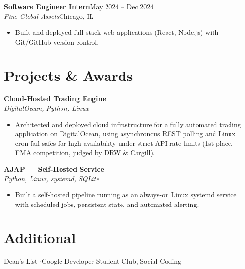 \documentclass[letterpaper,10.5pt]{article}
\newcommand{\entry}[4]{\textbf{#1}\hfill{\small #2}\\\textit{\small #3}\hfill{\small #4}\par\vspace{1pt}}
\begin{document}
\entry{Software Engineer Intern}{May 2024 -- Dec 2024}{Fine Global Assets}{Chicago, IL}
\begin{itemize}
  \item Built and deployed full-stack web applications (React, Node.js) with Git/GitHub version control.
\end{itemize}

\section{Projects \& Awards}
\entry{Cloud-Hosted Trading Engine}{}{DigitalOcean, Python, Linux}{}
\begin{itemize}
  \item Architected and deployed cloud infrastructure for a fully automated trading application on DigitalOcean, using asynchronous REST polling and Linux cron fail-safes for high availability under strict API rate limits (1st place, FMA competition, judged by DRW \& Cargill).
\end{itemize}

\entry{AJAP --- Self-Hosted Service}{}{Python, Linux, systemd, SQLite}{}
\begin{itemize}
  \item Built a self-hosted pipeline running as an always-on Linux systemd service with scheduled jobs, persistent state, and automated alerting.
\end{itemize}

\section{Additional}
{\small Dean's List \quad$\cdot$\quad Google Developer Student Club, Social Coding}
\end{document}
